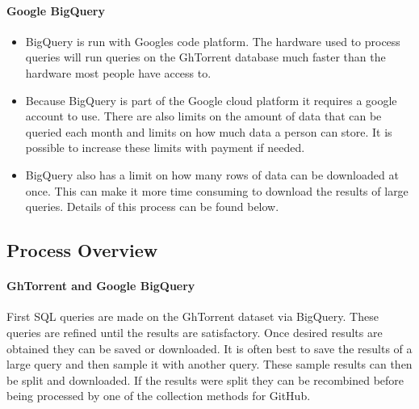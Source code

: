 \documentclass{article}
\begin{document}
\paragraph{Google BigQuery}
\begin{itemize}
    \item BigQuery is run with Googles code platform. The hardware used to process queries will run queries on the GhTorrent database much faster than the hardware most people have access to.

    \item Because BigQuery is part of the Google cloud platform it requires a google account to use. There are also limits on the amount of data that can be queried each month and limits on how much data a person can store. It is possible to increase these limits with payment if needed.

    \item BigQuery also has a limit on how many rows of data can be downloaded at once. This can make it more time consuming to download the results of large queries. Details of this process can be found below.
\end{itemize}


\subsection{Process Overview}

\paragraph{GhTorrent and Google BigQuery}
First SQL queries are made on the GhTorrent dataset via BigQuery. These queries are refined until the results are satisfactory. Once desired results are obtained they can be saved or downloaded. It is often best to save the results of a large query and then sample it with another query. These sample results can then be split and downloaded. If the results were split they can be recombined before being processed by one of the collection methods for GitHub.
\end{document}
